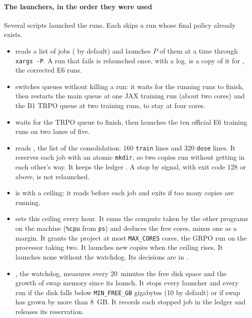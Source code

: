 
\paragraph{The launchers, in the order they were used}
Several scripts launched the runs. Each skips a run whose final policy already exists.
\begin{itemize}
  \item {} reads a list of jobs ( by default) and launches $P$ of them at a
    time through \texttt{xargs -P}. A run that fails is relaunched once, with a  log.
     is a copy of it for , the corrected E6 runs.
  \item {} switches queues without killing a run: it waits for the running runs to finish,
    then restarts the main queue at one JAX training run (about two cores) and the B1 TRPO queue at two
    training runs, to stay at four cores.
  \item {} waits for the TRPO queue to finish, then launches the ten official E6
    training runs on two lanes of five.
  \item {} reads , the list of the consolidation: 160
    \texttt{train} lines and 320 \texttt{dose} lines. It reserves each job with an atomic \texttt{mkdir}, so
    two copies run without getting in each other's way. It keeps the ledger . A stop
    by signal, with exit code 128 or above, is not relaunched.
  \item {} is  with a ceiling: it reads  before each job
    and exits if too many copies are running.
  \item {} sets this ceiling every hour. It sums the compute taken by the other programs on
    the machine (\texttt{\%cpu} from \texttt{ps}) and deduces the free cores, minus one as a margin. It grants
    the project at most \texttt{MAX\_CORES} cores, the GRPO run on the processor taking two. It launches new
     copies when the ceiling rises. It launches none without the watchdog. Its decisions are in
    .
  \item {}, the watchdog, measures every 20~minutes the free disk space and the growth of
    swap memory since its launch. It stops every launcher and every run if the disk falls below
    \texttt{MIN\_FREE\_GB} gigabytes (10 by default) or if swap has grown by more than 8~GB. It records each
    stopped job in the ledger and releases its reservation.
\end{itemize}

